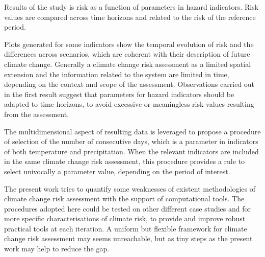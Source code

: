 Results of the study is risk as a function of parameters in hazard indicators. Risk values are compared across time horizons and related to the risk of the reference period.

Plots generated for some indicators show the temporal evolution of risk and the differences across scenarios, which are coherent with their description of future climate change. Generally a climate change risk assessment as a limited spatial extension and the information related to the system are limited in time, depending on the context and scope of the assessment. Observations carried out in the first result suggest that parameters for hazard indicators should be adapted to time horizons, to avoid excessive or meaningless risk values resulting from the assessment.

The multidimensional aspect of resulting data is leveraged to propose a procedure of selection of the number of consecutive days, which is a parameter in indicators of both temperature and precipitation. When the relevant indicators are included in the same climate change risk assessment, this procedure provides a rule to select univocally a parameter value, depending on the period of interest.

The present work tries to quantify some weaknesses of existent methodologies of climate change risk assessment with the support of computational tools. The procedures adopted here could be tested on other different case studies and for more specific characterisations of climate risk, to provide and improve robust practical tools at each iteration.
A uniform but flexible framework for climate change risk assessment may seems unreachable, but as tiny steps as the present work may help to reduce the gap.
